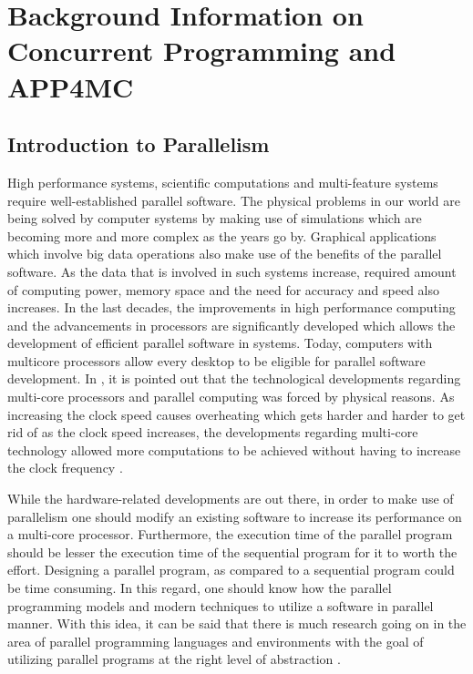 \chapter{Background Information on Concurrent Programming and APP4MC} \label{multicorechapter} 
\section{Introduction to Parallelism} %
High performance systems, scientific computations and multi-feature systems require well-established parallel software. The physical problems in our world are being solved by computer systems by making use of simulations which are becoming more and more complex as the years go by. Graphical applications which involve big data operations also make use of the benefits of the parallel software. As the data that is involved in such systems increase, required amount of computing power, memory space and the need for accuracy and speed also increases. In the last decades, the improvements in high performance computing and the advancements in processors are significantly developed which allows the development of efficient parallel software in systems. Today, computers with multicore processors allow every desktop to be eligible for parallel software development. In \cite{springerparallel}, it is pointed out that the technological developments regarding multi-core processors and parallel computing was forced by physical reasons. As increasing the clock speed causes overheating which gets harder and harder to get rid of as the clock speed increases, the developments regarding multi-core technology allowed more computations to be achieved without having to increase the clock frequency \cite{springerparallel}.

While the hardware-related developments are out there, in order to make use of parallelism one should modify an existing software to increase its performance on a multi-core processor. Furthermore, the execution time of the parallel program should be lesser the execution time of the sequential program for it to worth the effort. Designing a parallel program, as compared to a sequential program could be time consuming. In this regard, one should know how the parallel programming models and modern techniques to utilize a software in parallel manner. With this idea, it can be said that there is much research going on in the area of parallel programming languages and environments with the goal of utilizing parallel programs at the right level of abstraction \cite{springerparallel}.

